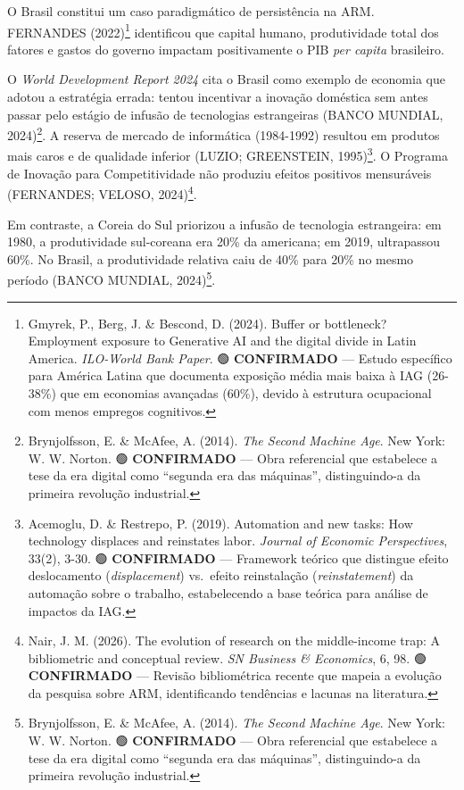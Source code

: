 \documentclass[
  brazilian,
  12pt,
]{article}
\begin{document}
O Brasil constitui um caso paradigmático de persistência na ARM. FERNANDES (2022)\footnote{Gmyrek, P., Berg, J. \& Bescond, D. (2024). Buffer or bottleneck? Employment exposure to Generative AI and the digital divide in Latin America. \emph{ILO-World Bank Paper}. 🟢 \textbf{CONFIRMADO} --- Estudo específico para América Latina que documenta exposição média mais baixa à IAG (26-38\%) que em economias avançadas (60\%), devido à estrutura ocupacional com menos empregos cognitivos.} identificou que capital humano, produtividade total dos fatores e gastos do governo impactam positivamente o PIB \emph{per capita} brasileiro.

O \emph{World Development Report 2024} cita o Brasil como exemplo de economia que adotou a estratégia errada: tentou incentivar a inovação doméstica sem antes passar pelo estágio de infusão de tecnologias estrangeiras (BANCO MUNDIAL, 2024)\footnote{Brynjolfsson, E. \& McAfee, A. (2014). \emph{The Second Machine Age}. New York: W. W. Norton. 🟢 \textbf{CONFIRMADO} --- Obra referencial que estabelece a tese da era digital como ``segunda era das máquinas'', distinguindo-a da primeira revolução industrial.}. A reserva de mercado de informática (1984-1992) resultou em produtos mais caros e de qualidade inferior (LUZIO; GREENSTEIN, 1995)\footnote{Acemoglu, D. \& Restrepo, P. (2019). Automation and new tasks: How technology displaces and reinstates labor. \emph{Journal of Economic Perspectives}, 33(2), 3-30. 🟢 \textbf{CONFIRMADO} --- Framework teórico que distingue efeito deslocamento (\emph{displacement}) vs.~efeito reinstalação (\emph{reinstatement}) da automação sobre o trabalho, estabelecendo a base teórica para análise de impactos da IAG.}. O Programa de Inovação para Competitividade não produziu efeitos positivos mensuráveis (FERNANDES; VELOSO, 2024)\footnote{Nair, J. M. (2026). The evolution of research on the middle-income trap: A bibliometric and conceptual review. \emph{SN Business \& Economics}, 6, 98. 🟢 \textbf{CONFIRMADO} --- Revisão bibliométrica recente que mapeia a evolução da pesquisa sobre ARM, identificando tendências e lacunas na literatura.}.

Em contraste, a Coreia do Sul priorizou a infusão de tecnologia estrangeira: em 1980, a produtividade sul-coreana era 20\% da americana; em 2019, ultrapassou 60\%. No Brasil, a produtividade relativa caiu de 40\% para 20\% no mesmo período (BANCO MUNDIAL, 2024)\footnote{Brynjolfsson, E. \& McAfee, A. (2014). \emph{The Second Machine Age}. New York: W. W. Norton. 🟢 \textbf{CONFIRMADO} --- Obra referencial que estabelece a tese da era digital como ``segunda era das máquinas'', distinguindo-a da primeira revolução industrial.}.
\end{document}
